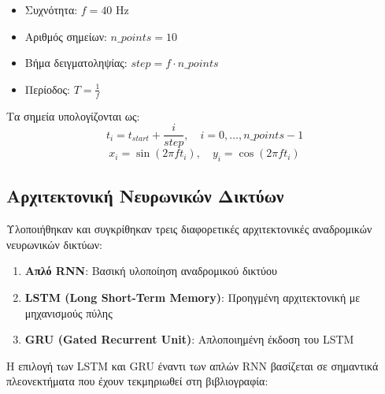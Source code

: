 \documentclass[a4paper,12pt]{article}
\begin{document}
\begin{itemize}
   \item Συχνότητα: $f = 40$ Hz
   \item Αριθμός σημείων: $n\_points = 10$
   \item Βήμα δειγματοληψίας: $step = f \cdot n\_points$
   \item Περίοδος: $T = \frac{1}{f}$
\end{itemize}

Τα σημεία υπολογίζονται ως:
\begin{equation}
   t_i = t_{start} + \frac{i}{step}, \quad i = 0,\ldots,n\_points-1
\end{equation}
\begin{equation}
   x_i = \sin(2\pi f t_i), \quad y_i = \cos(2\pi f t_i)
\end{equation}

\subsection*{Αρχιτεκτονική Νευρωνικών Δικτύων}

Υλοποιήθηκαν και συγκρίθηκαν τρεις διαφορετικές αρχιτεκτονικές αναδρομικών νευρωνικών δικτύων:

\begin{enumerate}
   \item \textbf{Απλό RNN}: Βασική υλοποίηση αναδρομικού δικτύου
   \item \textbf{LSTM (Long Short-Term Memory)}: Προηγμένη αρχιτεκτονική με μηχανισμούς πύλης \cite{hochreiter1997long}
   \item \textbf{GRU (Gated Recurrent Unit)}: Απλοποιημένη έκδοση του LSTM \cite{cho2014learning}
\end{enumerate}

Η επιλογή των LSTM και GRU έναντι των απλών RNN βασίζεται σε σημαντικά πλεονεκτήματα που έχουν τεκμηριωθεί στη βιβλιογραφία:
\end{document}

